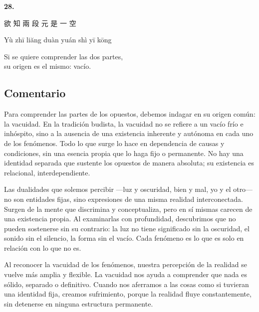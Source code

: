 \documentclass[
  a5paperpaper,
]{article}
\begin{document}
\hfill\break

\hypertarget{03}{}
\begin{verseblock}

\newpage

\begin{center}\textbf{28.}\end{center}

欲 知 兩 段 元 是 一 空

Yù zhī liăng duàn yuán shì yī kōng

Si se quiere comprender las dos partes,\\
su origen es el mismo: vacío.

\end{verseblock}

\hfill\break

\hypertarget{comentario-27}{%
\subsection{Comentario}\label{comentario-27}}

Para comprender las partes de los opuestos, debemos indagar en su origen
común: la vacuidad. En la tradición budista, la vacuidad no se refiere a
un vacío frío e inhóspito, sino a la ausencia de una existencia
inherente y autónoma en cada uno de los fenómenos. Todo lo que surge lo
hace en dependencia de causas y condiciones, sin una esencia propia que
lo haga fijo o permanente. No hay una identidad separada que sustente
los opuestos de manera absoluta; su existencia es relacional,
interdependiente.

Las dualidades que solemos percibir ---luz y oscuridad, bien y mal, yo y
el otro--- no son entidades fijas, sino expresiones de una misma
realidad interconectada. Surgen de la mente que discrimina y
conceptualiza, pero en sí mismas carecen de una existencia propia. Al
examinarlas con profundidad, descubrimos que no pueden sostenerse sin su
contrario: la luz no tiene significado sin la oscuridad, el sonido sin
el silencio, la forma sin el vacío. Cada fenómeno es lo que es solo en
relación con lo que no es.

Al reconocer la vacuidad de los fenómenos, nuestra percepción de la
realidad se vuelve más amplia y flexible. La vacuidad nos ayuda a
comprender que nada es sólido, separado o definitivo. Cuando nos
aferramos a las cosas como si tuvieran una identidad fija, creamos
sufrimiento, porque la realidad fluye constantemente, sin detenerse en
ninguna estructura permanente.
\end{document}
